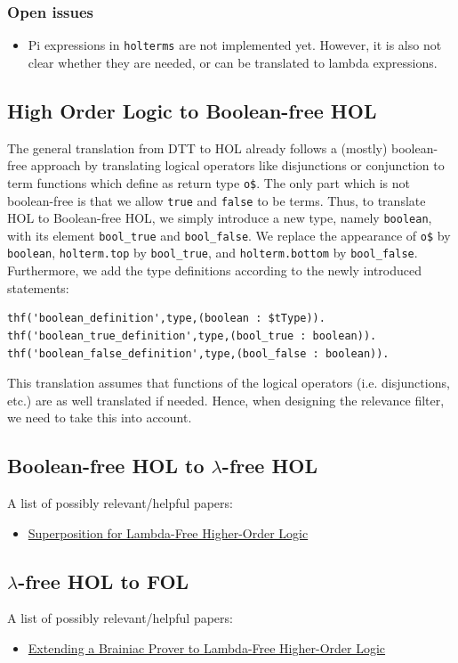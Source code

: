 \documentclass[a4paper]{article}
\begin{document}
\subsubsection{Open issues}
\begin{itemize}
	\item Pi expressions in \texttt{holterms} are not implemented yet. However, it is also not clear whether they are needed, or can be translated to lambda expressions.
\end{itemize}
\subsection{High Order Logic to Boolean-free HOL}
\label{sec:hol_to_boolean_free}
The general translation from DTT to HOL already follows a (mostly) boolean-free approach by translating logical operators like disjunctions or conjunction to term functions which define as return type \texttt{o\$}. The only part which is not boolean-free is that we allow \texttt{true} and \texttt{false} to be terms. Thus, to translate HOL to Boolean-free HOL, we simply introduce a new type, namely \texttt{boolean}, with its element \texttt{bool\_true} and \texttt{bool\_false}. We replace the appearance of \texttt{o\$} by \texttt{boolean}, \texttt{holterm.top} by \texttt{bool\_true}, and \texttt{holterm.bottom} by \texttt{bool\_false}. Furthermore, we add the type definitions according to the newly introduced statements:
\begin{verbatim}
thf('boolean_definition',type,(boolean : $tType)).
thf('boolean_true_definition',type,(bool_true : boolean)).
thf('boolean_false_definition',type,(bool_false : boolean)).
\end{verbatim}
This translation assumes that functions of the logical operators (i.e. disjunctions, etc.) are as well translated if needed. Hence, when designing the relevance filter, we need to take this into account.
\subsection{Boolean-free HOL to $\lambda$-free HOL}
A list of possibly relevant/helpful papers:
\begin{itemize}
	\item \href{http://matryoshka.gforge.inria.fr/pubs/lfhosup_paper.pdf}{Superposition for Lambda-Free Higher-Order Logic} \cite{LambdaFreeHOL}
\end{itemize}
\subsection{$\lambda$-free HOL to FOL}
A list of possibly relevant/helpful papers:
\begin{itemize}
	\item \href{https://link.springer.com/chapter/10.1007/978-3-030-17462-0_11}{Extending a Brainiac Prover to Lambda-Free Higher-Order Logic} \cite{ExtendFOLtoLambdaFreeHOL}
\end{itemize}
\end{document}
